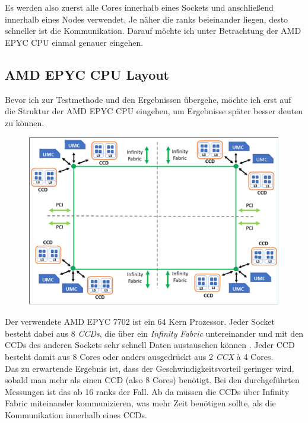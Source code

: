 \documentclass[german,plainarticle,hyperref,utf8]{zihpub}
\begin{document}
	Es werden also zuerst alle Cores innerhalb eines Sockets und anschließend innerhalb eines Nodes verwendet. Je näher die ranks beieinander liegen, desto schneller ist die Kommunikation. Darauf möchte ich unter Betrachtung der AMD EPYC CPU einmal genauer eingehen.
	
	\subsection{AMD EPYC CPU Layout} \label{cpu_layout}
	Bevor ich zur Testmethode und den Ergebnissen übergehe, möchte ich erst auf die Struktur der AMD EPYC CPU eingehen, um Ergebnisse später besser deuten zu können.\\
	
	\begin{figure}[h]
		\centering
		\includegraphics[scale=0.5]{AMD_EPYC.png}
	\end{figure}
	
	Der verwendete AMD EPYC 7702 ist ein 64 Kern Prozessor. Jeder Socket besteht dabei aus 8 \textit{CCDs}, die über ein \textit{Infinity Fabric} untereinander und mit den CCDs des anderen Sockets sehr schnell Daten austauschen können \cite{amd}. Jeder CCD besteht damit aus 8 Cores oder anders ausgedrückt aus 2 \textit{CCX} à 4 Cores.\\
	
	Das zu erwartende Ergebnis ist, dass der Geschwindigkeitsvorteil geringer wird, sobald man mehr als einen CCD (also 8 Cores) benötigt. Bei den durchgeführten Messungen ist das ab 16 ranks der Fall. Ab da müssen die CCDs über Infinity Fabric miteinander kommunizieren, was mehr Zeit benötigen sollte, als die Kommunikation innerhalb eines CCDs.\\
	
\end{document}
